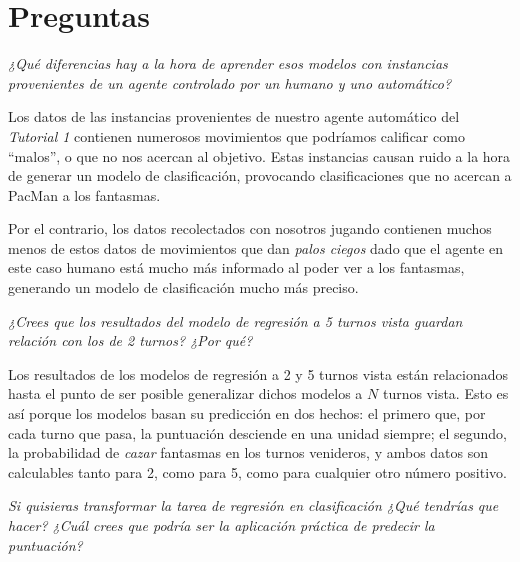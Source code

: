 \documentclass[12pt]{article}
\begin{document}
\newpage
\section{Preguntas}

\begin{center}
    \vspace{0.5cm} \emph{¿Qué diferencias hay a la hora de aprender esos modelos con instancias provenientes de un agente controlado por un humano y uno automático?}
    \vspace{0.5cm}
\end{center}

Los datos de las instancias provenientes de nuestro agente automático del \emph{Tutorial 1} contienen numerosos movimientos que podríamos calificar como ``malos'', o que no nos acercan al objetivo. Estas instancias causan ruido a la hora de generar un modelo de clasificación, provocando clasificaciones que no acercan a PacMan a los fantasmas.

Por el contrario, los datos recolectados con nosotros jugando contienen muchos menos de estos datos de movimientos que dan \emph{palos ciegos} dado que el agente en este caso humano está mucho más informado al poder ver a los fantasmas, generando un modelo de clasificación mucho más preciso.

\begin{center}
    \vspace{0.5cm} \emph{¿Crees que los resultados del modelo de regresión a 5 turnos vista guardan relación con los de 2 turnos? ¿Por qué?}
    \vspace{0.5cm}
\end{center}

Los resultados de los modelos de regresión a 2 y 5 turnos vista están relacionados hasta el punto de ser posible generalizar dichos modelos a $N$ turnos vista. Esto es así porque los modelos basan su predicción en dos hechos: el primero que, por cada turno que pasa, la puntuación desciende en una unidad siempre; el segundo, la probabilidad de \emph{cazar} fantasmas en los turnos venideros, y ambos datos son calculables tanto para 2, como para 5, como para cualquier otro número positivo.

\begin{center}
    \vspace{0.5cm} \emph{Si quisieras transformar la tarea de regresión en clasificación ¿Qué tendrías que hacer? ¿Cuál crees que podría ser la aplicación práctica de predecir la puntuación?}
    \vspace{0.5cm}
\end{center}
\end{document}
